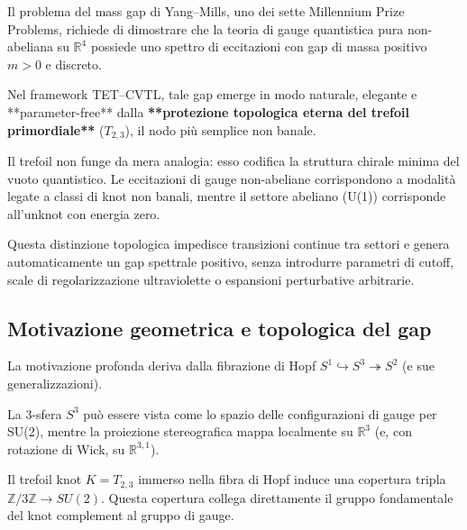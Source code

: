 \documentclass[11pt,a4paper]{article}
\theoremstyle{plain}
\theoremstyle{definition}
\begin{document}
Il problema del mass gap di Yang--Mills, uno dei sette Millennium Prize Problems, richiede di dimostrare che la teoria di gauge quantistica pura non-abeliana su \(\mathbb{R}^4\) possiede uno spettro di eccitazioni con gap di massa positivo \(m > 0\) e discreto. 

\vspace{0.3cm}

Nel framework TET--CVTL, tale gap emerge in modo naturale, elegante e **parameter-free** dalla \textbf{**protezione topologica eterna del trefoil primordiale**} (\(T_{2,3}\)), il nodo più semplice non banale.

\vspace{0.2cm}

Il trefoil non funge da mera analogia: esso codifica la struttura chirale minima del vuoto quantistico. Le eccitazioni di gauge non-abeliane corrispondono a modalità legate a classi di knot non banali, mentre il settore abeliano (U(1)) corrisponde all'unknot con energia zero. 


\vspace{0.2cm}


Questa distinzione topologica impedisce transizioni continue tra settori e genera automaticamente un gap spettrale positivo, senza introdurre parametri di cutoff, scale di regolarizzazione ultraviolette o espansioni perturbative arbitrarie.


\vspace{0.3cm}

\subsection{Motivazione geometrica e topologica del gap}

\vspace{0.2cm}

La motivazione profonda deriva dalla fibrazione di Hopf \(S^1 \hookrightarrow S^3 \twoheadrightarrow S^2\) (e sue generalizzazioni). 

\vspace{0.3cm}

La 3-sfera \(S^3\) può essere vista come lo spazio delle configurazioni di gauge per SU(2), mentre la proiezione stereografica mappa localmente su \(\mathbb{R}^3\) (e, con rotazione di Wick, su \(\mathbb{R}^{3,1}\)).

\vspace{0.3cm}

Il trefoil knot \(K = T_{2,3}\) immerso nella fibra di Hopf induce una copertura tripla \(\mathbb{Z}/3\mathbb{Z} \to SU(2)\). Questa copertura collega direttamente il gruppo fondamentale del knot complement al gruppo di gauge. 
\end{document}
